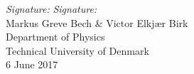 \begin{center}
\emph{Signature:}\underline{\qquad \qquad \qquad \qquad \qquad} \hspace{1.5cm} \emph{Signature:} \underline{\qquad \qquad \qquad \qquad \qquad}\\[2mm]
Markus Greve Bech \& Victor Elkjær Birk\\
Department of Physics\\
Technical University of Denmark\\
6 June 2017
\end{center}


\tableofcontents


\listoffigures
{}

\listoftables
{}

